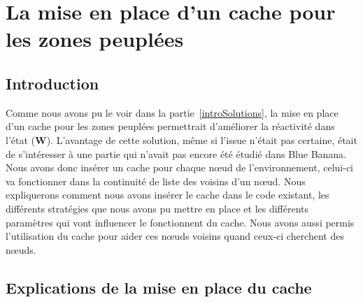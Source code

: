 \section{La mise en place d'un cache pour les zones peuplées}
\subsection{Introduction}
Comme nous avons pu le voir dans la partie~\ref{introSolutions}, la mise en place d'un cache pour les zones peuplées permettrait d'améliorer la réactivité dans l'état (\textbf{W}). L'avantage de cette solution, même si l'issue n'était pas certaine, était de s'intéresser à une partie qui n'avait pas encore été étudié dans Blue Banana. Nous avons donc insérer un cache pour chaque nœud de l'environnement, celui-ci va fonctionner dans la continuité de liste des voisins d'un nœud. Nous expliquerons comment nous avons insérer le cache dans le code existant, les différents stratégies que nous avons pu mettre en place et les différents paramètres qui vont influencer le fonctionnent du cache. Nous avons aussi permis l'utilisation du cache pour aider ces nœuds voisins quand ceux-ci cherchent des nœuds.
 
\subsection{Explications de la mise en place du cache}

